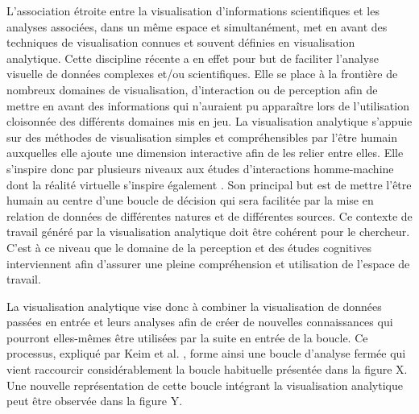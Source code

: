 L'association étroite entre la visualisation d'informations scientifiques et les analyses associées, dans un même espace et simultanément, met en avant des techniques de visualisation connues et souvent définies en visualisation analytique. Cette discipline récente a en effet pour but de faciliter l'analyse visuelle de données complexes et/ou scientifiques. Elle se place à la frontière de nombreux domaines de visualisation, d'interaction ou de perception afin de mettre en avant des informations qui n'auraient pu apparaître lors de l'utilisation cloisonnée des différents domaines mis en jeu. La visualisation analytique s'appuie sur des méthodes de visualisation simples et compréhensibles par l'être humain auxquelles elle ajoute une dimension interactive afin de les relier entre elles. Elle s'inspire donc par plusieurs niveaux aux études d'interactions homme-machine dont la réalité virtuelle s'inspire également \cite{arias-hernandez_visual_2011}. Son principal but est de mettre l'être humain au centre d'une boucle de décision qui sera facilitée par la mise en relation de données de différentes natures et de différentes sources. Ce contexte de travail généré par la visualisation analytique doit être cohérent pour le chercheur. C'est à ce niveau que le domaine de la perception et des études cognitives interviennent afin d'assurer une pleine compréhension et utilisation de l'espace de travail.

La visualisation analytique vise donc à combiner la visualisation de données passées en entrée et leurs analyses afin de créer de nouvelles connaissances qui pourront elles-mêmes être utilisées par la suite en entrée de la boucle. Ce processus, expliqué par Keim et al. \cite{keim2010mastering}, forme ainsi une boucle d'analyse fermée qui vient raccourcir considérablement la boucle habituelle présentée dans la figure X. Une nouvelle représentation de cette boucle intégrant la visualisation analytique peut être observée dans la figure Y.

